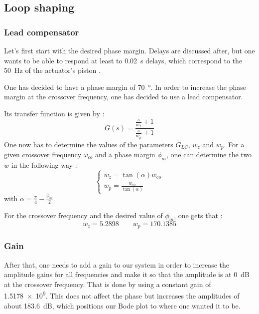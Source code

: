 \subsection{Loop shaping}
\subsubsection{Lead compensator}
Let's first start with the desired phase margin. Delays are discussed after, but one wants to be able to respond at least to \SI{0.02}{\second} delays, which correspond to the \SI{50}{\hertz} of the actuator's piston \cite{Hassan_2016}.\par
One has decided to have a phase margin of \SI{70}{\degree}. In order to increase the phase margin at the crossover frequency, one has decided to use a lead compensator.\par
Its transfer function is given by : 
$$
G(s) = \dfrac{\frac{s}{w_z} + 1}{\frac{s}{w_p} +1}
$$
One now has to determine the values of the parameters $G_{LC}$, $w_z$ and $w_p$. For a given crossover frequency $\omega_{co}$ and a phase margin $\phi_m$, one can determine the two $w$ in the following way : 
$$
\left\{\begin{array}{l}
    {w_{z}=\tan (\alpha) w_{\mathrm{co}}} \\
    {w_{p}=\frac{w_{\mathrm{co}}}{\tan (\alpha)}}
\end{array}\right.
$$
with $\alpha = \frac{\pi}{4} - \frac{\phi_m}{2}$.\par
For the crossover frequency and the desired value of $\phi_m$, one gets that : 
$$
w_z = \num{5.2898} \qquad w_p = \num{170.1385}
$$

\subsubsection{Gain}
After that, one needs to add a gain to our system in order to increase the amplitude gains for all frequencies and make it so that the amplitude is at \SI{0}{\deci\bel} at the crossover frequency. That is done by using a constant gain of \num{1.5178e9}. This does not affect the phase but increases the amplitudes of about \SI{183.6}{\deci\bel}, which positions our Bode plot to where one wanted it to be.

